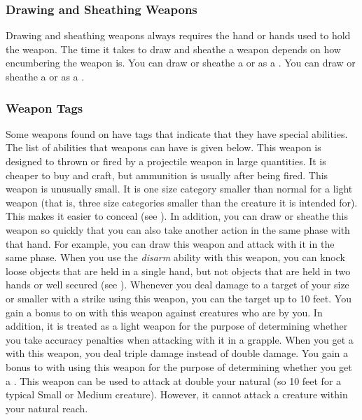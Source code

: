         \subsubsection{Drawing and Sheathing Weapons}\label{Drawing and Sheathing Weapons}
            Drawing and sheathing weapons always requires the hand or hands used to hold the weapon.
            The time it takes to draw and sheathe a weapon depends on how encumbering the weapon is.
            You can draw or sheathe a  or  as a .
            You can draw or sheathe a  or  as a .

        \subsubsection{Weapon Tags}\label{Weapon Tags}
            Some weapons found on  have tags that indicate that they have special abilities. The list of abilities that weapons can have is given below.
             This weapon is designed to thrown or fired by a projectile weapon in large quantities. It is cheaper to buy and craft, but ammunition is usually  after being fired.
             This weapon is unusually small.
            It is one size category smaller than normal for a light weapon (that is, three size categories smaller than the creature it is intended for).
            This makes it easier to conceal (see ).
            In addition, you can draw or sheathe this weapon so quickly that you can also take another action in the same phase with that hand.
            For example, you can draw this weapon and attack with it in the same phase.
             When you use the \textit{disarm} ability with this weapon, you can knock loose objects that are held in a single hand, but not objects that are held in two hands or well secured (see ).
             Whenever you deal damage to a target of your size or smaller with a strike using this weapon, you can  the target up to 10 feet.
             You gain a  bonus to  on  with this weapon against creatures who are  by you.
            In addition, it is treated as a light weapon for the purpose of determining whether you take accuracy penalties when attacking with it in a grapple.
             When you get a  with this weapon, you deal triple damage instead of double damage.
             You gain a  bonus to  with  using this weapon for the purpose of determining whether you get a .
            \label{Long Weapon} This weapon can be used to attack at double your natural  (so 10 feet for a typical Small or Medium creature).
            However, it cannot attack a creature within your natural reach.

